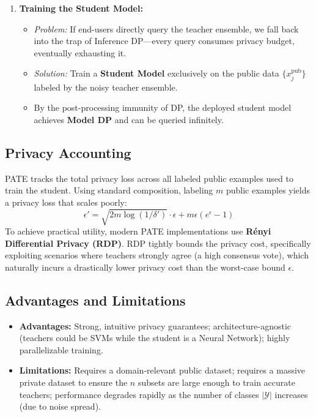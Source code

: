 \documentclass[11pt, a4paper]{article}
\begin{document}
\begin{enumerate}
    \item \textbf{Training the Student Model:}
    \begin{itemize}
        \item \textit{Problem:} If end-users directly query the teacher ensemble, we fall back into the trap of Inference DP—every query consumes privacy budget, eventually exhausting it.
        \item \textit{Solution:} Train a \textbf{Student Model} exclusively on the public data $\{x_j^{\text{pub}}\}$ labeled by the noisy teacher ensemble.
        \item By the post-processing immunity of DP, the deployed student model achieves \textbf{Model DP} and can be queried infinitely.
    \end{itemize}
\end{enumerate}

\subsection{Privacy Accounting}
PATE tracks the total privacy loss across all labeled public examples used to train the student. Using standard composition, labeling $m$ public examples yields a privacy loss that scales poorly:
\[
\epsilon' = \sqrt{2m \log(1/\delta')} \cdot \epsilon + m\epsilon(e^\epsilon - 1)
\]
To achieve practical utility, modern PATE implementations use \textbf{R\'enyi Differential Privacy (RDP)}. RDP tightly bounds the privacy cost, specifically exploiting scenarios where teachers strongly agree (a high consensus vote), which naturally incurs a drastically lower privacy cost than the worst-case bound $\epsilon$.

\subsection{Advantages and Limitations}
\begin{itemize}
    \item \textbf{Advantages:} Strong, intuitive privacy guarantees; architecture-agnostic (teachers could be SVMs while the student is a Neural Network); highly parallelizable training.
    \item \textbf{Limitations:} Requires a domain-relevant public dataset; requires a massive private dataset to ensure the $n$ subsets are large enough to train accurate teachers; performance degrades rapidly as the number of classes $|\mathcal{Y}|$ increases (due to noise spread).
\end{itemize}
{\small


% 
}
\end{document}
